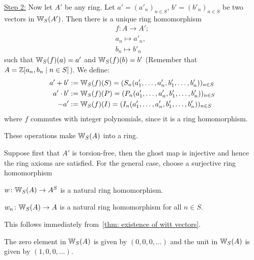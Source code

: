 \begin{bigproof}
    \underline{Step 2:} Now let $A'$ be any ring.
    Let $a' = (a'_n)_{n \in S}$, $b' = (b'_n)_{n \in S}$ be two vectors in $\mathbb{W}_S(A')$.
    Then there is a unique ring homomorphism
    \begin{align*}
        f \colon A \to A'; \\
        a_n \mapsto a'_n, \\
        b_n \mapsto b'_n
    \end{align*}
    such that $\mathbb{W}_S(f)(a) = a'$ and $\mathbb{W}_S(f)(b) = b'$
    (Remember that $A = \mathbb{Z}[a_n,b_n \mid n \in S]$).
    We define:
    \begin{align*}
        a'+ b' &:= \mathbb{W}_S(f)(S) 
        = (S_n(a'_1,\dots,a'_n,b'_1,\dots,b'_n))_{n \in S} \\
        a' \cdot b' &:= \mathbb{W}_S(f)(P) = (P_n(a'_1,\dots,a'_n,b'_1,\dots,b'_n))_{n \in S} \\
        -a' &:= \mathbb{W}_S(f)(I) = (I_n(a'_1,\dots,a'_n,b'_1,\dots,b'_n))_{n \in S}
    \end{align*}
    where $f$ commutes with integer polynomials, since it is a ring homomorphism.
\begin{claim*}
    These operations make $\mathbb{W}_S(A)$ into a ring.
\end{claim*}
\begin{smallproof}
    Suppose first that $A'$ is torsion-free, then the ghost map is injective
    and hence the ring axioms are satisfied.
    For the general case, choose a surjective ring homomorphism 
\end{smallproof}
\begin{claim*}
    $w \colon \mathbb{W}_S(A) \to A^S$ is a natural ring homomorphism.
\end{claim*}
\end{bigproof}
\begin{cor} \label{cor: ghost components are nat trafos}
    $w_n \colon \mathbb{W}_S(A) \to A$ is a natural ring homomorphism for all $n \in S$.
\end{cor}
\begin{beweis}
    This follows immediately from~\ref{thm: existence of witt vectors}.
\end{beweis}
\begin{lemma}
    The zero element in $\mathbb{W}_S(A)$ is given by $(0,0,0,\dots)$ and the
    unit in $\mathbb{W}_S(A)$ is given by $(1,0,0,\dots)$.
\end{lemma}
